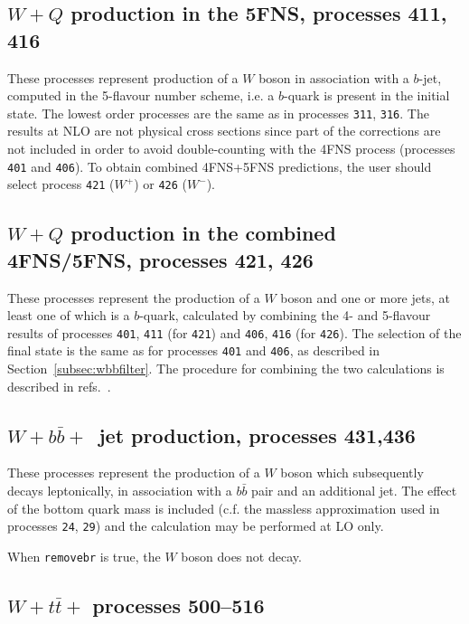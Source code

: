 \documentclass[12pt]{article}
\begin{document}
\subsection{$W+Q$ production in the 5FNS, processes 411, 416}
\label{subsec:wb5FNS}

These processes represent production of a $W$ boson in association with a
$b$-jet, computed in the 5-flavour number scheme, i.e. a $b$-quark is present in
the initial state. The lowest order processes are the same as in processes {\tt 311}, {\tt 316}.
The results at NLO are not physical cross sections since part of the corrections
are not included in order to avoid double-counting with the 4FNS process (processes
{\tt 401} and {\tt 406}). To obtain combined 4FNS+5FNS predictions, the user
should select process {\tt 421} ($W^+$) or {\tt 426} ($W^-$).

\subsection{$W+Q$ production in the combined 4FNS/5FNS, processes 421, 426}
\label{subsec:wbcombined}
These processes represent the production of a $W$ boson and one or more jets,
at least one of which is a $b$-quark, calculated by combining the 4- and 5-flavour results
of processes {\tt 401}, {\tt 411} (for {\tt 421}) and {\tt 406}, {\tt 416} (for {\tt 426}).
The selection of the final state is the same as for processes {\tt 401} and {\tt 406}, as
described in Section~\ref{subsec:wbbfilter}. The procedure for combining the two
calculations is described in refs.~\cite{Campbell:2008hh,Caola:2011pz}.

\subsection{$W+b{\bar b}+$~jet production, processes 431,436}
\label{subsec:wbbjetmassive}

These processes represent the production of a $W$ boson which subsequently
decays leptonically, in association with a $b{\bar b}$ pair and an
additional jet. The effect of the bottom quark mass is included (c.f. the massless approximation
used in processes {\tt 24}, {\tt 29})
and the calculation may be performed at LO only.

When {\tt removebr} is true, the $W$ boson does not decay.

\subsection{$W+t{\bar t}+$ processes 500--516}
\label{subsec:wttdecay}
\end{document}
